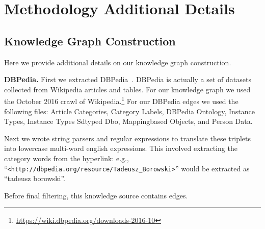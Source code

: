 \documentclass[final]{cvpr}
\providecommand{\myparagraph}[1]{\noindent\textbf{#1.}}
\begin{document}
\vspace{.2cm}



{\small


}

\clearpage
\appendix

\section{Methodology Additional Details}
\label{appx:method}

\subsection{Knowledge Graph Construction}
\label{appx:kgconstruction}
Here we provide additional details on our knowledge graph construction.

\myparagraph{DBPedia}
First we extracted DBPedia~\cite{auer2007dbpedia}. DBPedia is actually a set of datasets collected from Wikipedia articles and tables. For our knowledge graph we used the October 2016 crawl of Wikipedia.\footnote{\url{https://wiki.dbpedia.org/downloads-2016-10}} For our DBPedia edges we used the following files: Article Categories, Category Labels, DBPedia Ontology, Instance Types, Instance Types Sdtyped Dbo, Mappingbased Objects, and Person Data. 

Next we wrote string parsers and regular expressions to translate these triplets into lowercase multi-word english expressions. This involved extracting the category words from the hyperlink: e.g., ``\texttt{\footnotesize <http://dbpedia.org/resource/Tadeusz\_Borowski>}'' would be extracted as ``tadeusz borowski''. 

Before final filtering, this knowledge source contains  edges.
\end{document}
